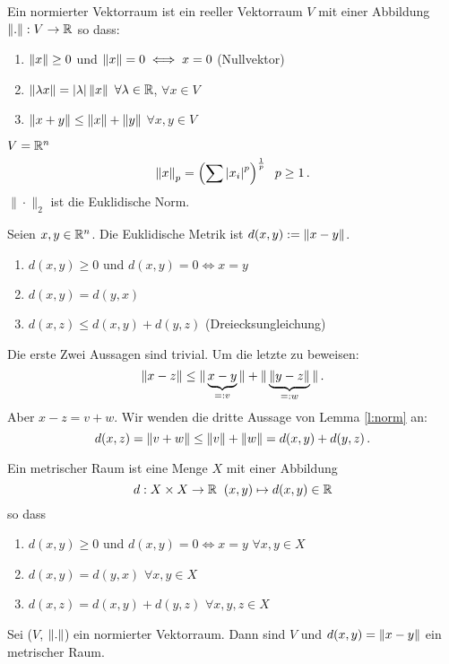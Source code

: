 \begin{Def}
  Ein normierter Vektorraum ist ein reeller Vektorraum $V$ mit einer Abbildung $\left\| . \right\| :V\rightarrow\mathbb{R}$ so dass:
  \begin{enumerate}
    \item $\left\| x \right\|\geq 0$ und $\left\| x \right\|=0\iff x=0$ (Nullvektor)
    \item $\left\| \lambda x \right\|=\mathopen| \lambda \mathclose|\left\| x \right\|$ $\forall \lambda\in\mathbb{R}$, $\forall x\in V$
    \item $\left\| x+y \right\|\leq\left\| x \right\|+\left\| y \right\|$ $\forall x,y\in V$
  \end{enumerate}
\end{Def}
\begin{Bsp}
  $V=\mathbb{R}^n$
  \[\left\| x \right\|_p=\left(\sum\left| x_i \right|^p\right)^{\frac{1}{p}}\hspace{2mm} p\geq 1\, .\]
$\|\cdot\|_2$ ist die Euklidische Norm.
\end{Bsp}
\begin{Def}
  Seien $x,y\in\mathbb{R}^n$. Die Euklidische Metrik ist $d(x,y):=\left\| x-y \right\|$.
\end{Def}
\begin{Lem}\label{l:euk_met}
  \begin{enumerate}
    \item $d(x,y)\geq 0$ und $d(x,y)=0\iff x=y$
    \item $d(x,y)=d(y,x)$
    \item $d(x,z)\leq d(x,y)+d(y,z)$ (Dreiecksungleichung)
  \end{enumerate}
\end{Lem}
\begin{Bew} Die erste Zwei Aussagen sind trivial. Um die letzte zu beweisen:
  \[\left\| x-z \right\|\leq\|\underbrace{x-y}_{=:v}\|+\|\underbrace{\left\| y-z \right\|}_{=:w}\|\, .\]
Aber $x-z=v+w$. Wir wenden die dritte Aussage von Lemma \ref{l:norm} an:
  \[d (x,z) = \left\| v+w \right\|\leq\left\| v \right\|+\left\| w \right\| = d (x,y)+d(y,z)\, .\]
\end{Bew}
\begin{Def}
  Ein metrischer Raum ist eine Menge $X$ mit einer Abbildung
  \[d:X\times X\rightarrow\mathbb{R}\hspace{2mm} (x,y)\mapsto d(x,y)\in\mathbb{R}\]so dass
  \begin{enumerate}
    \item $d(x,y)\geq 0$ und $d(x,y)=0\iff x=y$ $\forall x,y\in X$
    \item $d(x,y)=d(y,x)$ $\forall x,y\in X$
    \item $d(x,z)=d(x,y)+d(y,z)$ $\forall x,y,z\in X$
  \end{enumerate}
\end{Def}
\begin{Lem}
  Sei ($V$, $\left\| . \right\|$) ein normierter Vektorraum. Dann sind $V$ und $d(x,y)=\left\| x-y \right\|$ ein metrischer Raum.
\end{Lem}
